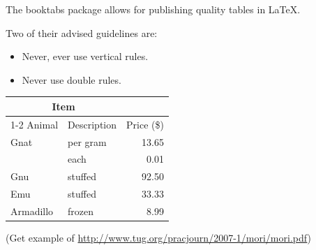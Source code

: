 \documentclass{boostreport}
\begin{document}
The booktabs package allows for publishing quality tables in \LaTeX{}.

Two of their advised guidelines are:

\begin{itemize}
    \item Never, ever use vertical rules.
    \item Never use double rules.
\end{itemize}

\begin{table}[!ht]
    \centering
    \begin{tabular}{@{}llr@{}} \toprule
        \multicolumn{2}{c}{Item} \\ \cmidrule(r){1-2}
        Animal & Description & Price (\$)\\ \midrule
        Gnat & per gram & 13.65 \\
        & each
        & 0.01 \\
        Gnu
        & stuffed
        & 92.50 \\
        Emu
        & stuffed
        & 33.33 \\
        Armadillo & frozen & 8.99 \\ \bottomrule
    \end{tabular}
\end{table}

(Get example of \url{http://www.tug.org/pracjourn/2007-1/mori/mori.pdf})
\end{document}
